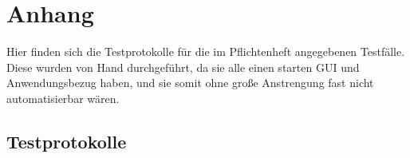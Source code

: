 \documentclass[a4paper]{scrreprt}
\begin{document}
\chapter{Anhang}

Hier finden sich die Testprotokolle für die im Pflichtenheft angegebenen
Testfälle. Diese wurden von Hand durchgeführt, da sie alle einen starten GUI und
Anwendungsbezug haben, und sie somit ohne große Anstrengung fast nicht
automatisierbar wären.

\section{Testprotokolle} 
















\newpage
\end{document}
